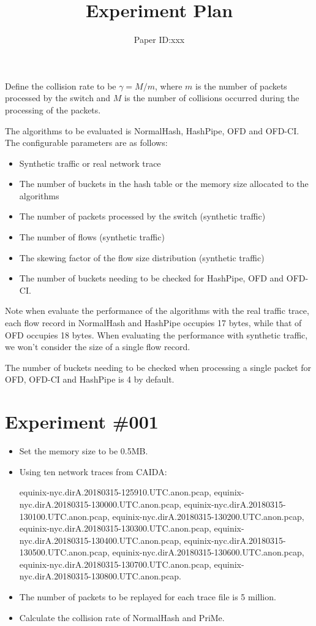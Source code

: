 \documentclass[10pt, conference, letterpaper]{IEEEtran}
\begin{document}
\title{Experiment Plan}
\author{Paper ID:xxx}
\maketitle
Define the collision rate to be $\gamma=M/m$, where $m$ is the number of packets processed by the switch and $M$ is the number of collisions occurred during the processing of the packets.

The algorithms to be evaluated is NormalHash, HashPipe, OFD and OFD-CI. The configurable parameters are as follows:
\begin{itemize}
\item Synthetic traffic or real network trace
\item The number of buckets in the hash table or the memory size allocated to the algorithms
\item The number of packets processed by the switch (synthetic traffic)
\item The number of flows (synthetic traffic)
\item The skewing factor of the flow size distribution (synthetic traffic)
\item The number of buckets needing to be checked for HashPipe, OFD and OFD-CI.
\end{itemize}

Note when evaluate the performance of the algorithms with the real traffic trace, each flow record in NormalHash and HashPipe occupies 17 bytes, while that of OFD occupies 18 bytes. When evaluating the performance with synthetic traffic, we won't consider the size of a single flow record.

The number of buckets needing to be checked when processing a single packet for OFD, OFD-CI and HashPipe is 4 by default.

\section*{Experiment \#001}
\begin{itemize}
	\item Set the memory size to be 0.5MB.
	\item Using ten network traces from CAIDA:

equinix-nyc.dirA.20180315-125910.UTC.anon.pcap,
equinix-nyc.dirA.20180315-130000.UTC.anon.pcap, 
equinix-nyc.dirA.20180315-130100.UTC.anon.pcap, 
equinix-nyc.dirA.20180315-130200.UTC.anon.pcap, 
equinix-nyc.dirA.20180315-130300.UTC.anon.pcap, 
equinix-nyc.dirA.20180315-130400.UTC.anon.pcap, 
equinix-nyc.dirA.20180315-130500.UTC.anon.pcap, 
equinix-nyc.dirA.20180315-130600.UTC.anon.pcap, 
equinix-nyc.dirA.20180315-130700.UTC.anon.pcap, 
equinix-nyc.dirA.20180315-130800.UTC.anon.pcap.
	\item The number of packets to be replayed for each trace file is 5 million.
	\item Calculate the collision rate of NormalHash and PriMe.
\end{itemize}
\end{document}
